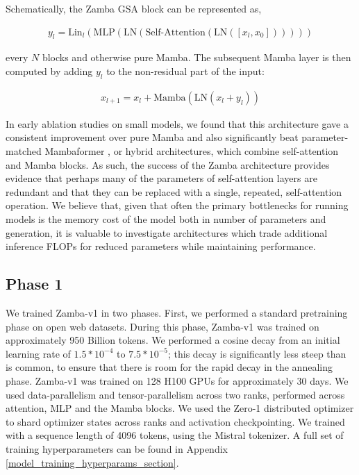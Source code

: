 Schematically, the Zamba GSA block can be represented as,

\begin{align}
    y_{l} = \text{Lin}_{l} ( \text{MLP}(\text{LN}(\text{Self-Attention}(\text{LN}([x_l, x_0])))))
\end{align}

every $N$ blocks and otherwise pure Mamba. The subsequent Mamba layer is then computed by adding $y_l$ to the non-residual part of the input:

\begin{align}
    x_{l+1} = x_l + \text{Mamba}(\text{LN}(x_l + y_l))
\end{align}

In early ablation studies on small models, we found that this architecture gave a consistent improvement over pure Mamba and also significantly beat parameter-matched Mambaformer \citep{park2024mamba}, or hybrid architectures, which combine self-attention and Mamba blocks. As such, the success of the Zamba architecture provides evidence that perhaps many of the parameters of self-attention layers are redundant and that they can be replaced with a single, repeated, self-attention operation. We believe that, given that often the primary bottlenecks for running models is the memory cost of the model both in number of parameters and generation, it is valuable to investigate architectures which trade additional inference FLOPs for reduced parameters while maintaining performance. 

\subsection{Phase 1}

We trained Zamba-v1 in two phases. First, we performed a standard pretraining phase on open web datasets. During this phase, Zamba-v1 was trained on approximately 950 Billion tokens. We performed a cosine decay from an initial learning rate of $1.5*10^{-4}$ to $7.5*10^{-5}$; this decay is significantly less steep than is common, to ensure that there is room for the rapid decay in the annealing phase. Zamba-v1 was trained on 128 H100 GPUs for approximately 30 days. We used data-parallelism and tensor-parallelism across two ranks, performed across attention, MLP and the Mamba blocks. We used the Zero-1 distributed optimizer to shard optimizer states across ranks and activation checkpointing. We trained with a sequence length of 4096 tokens, using the Mistral tokenizer. A full set of training hyperparameters can be found in Appendix \ref{model_training_hyperparams_section}.

